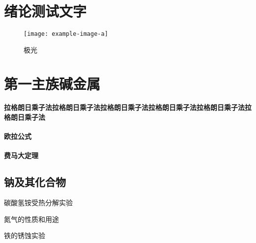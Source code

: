\documentclass[color=BLUE]{textbook-cn}%
\begin{document}
\chapter{绪论\quad 测试文字}


\lipsum
\begin{figure}[htbp]
\centering\texttt{[image: example-image-a]}
\caption{极光}
\end{figure}




\chapter{第一主族\quad 碱金属}


\subsubsection*{拉格朗日乘子法拉格朗日乘子法拉格朗日乘子法拉格朗日乘子法拉格朗日乘子法拉格朗日乘子法}
\lipsum[1-3]

\subsubsection*{欧拉公式}
\lipsum[1-2]

\subsubsection*{费马大定理}
\lipsum[2-3]



\section{钠及其化合物}

\begin{Point}
\lipsum[2]
\end{Point}

\begin{Case}
\item 碳酸氢铵受热分解实验
\item 氮气的性质和用途
\item 铁的锈蚀实验
\end{Case}
\end{document}
